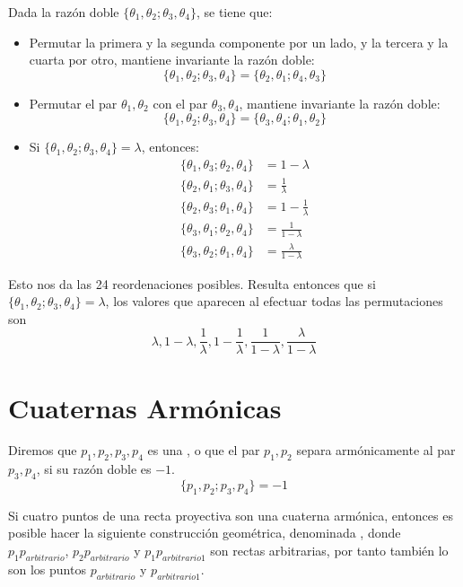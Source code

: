 Dada la razón doble $\{\theta_1,\theta_2;\theta_3,\theta_4\}$, se tiene que:
\begin{itemize}
	\item Permutar la primera y la segunda componente por un lado, y la tercera y la cuarta por otro, mantiene invariante la razón doble: \[\{\theta_1,\theta_2;\theta_3,\theta_4\}=\{\theta_2,\theta_1;\theta_4,\theta_3\}\]
	
	\item Permutar el par $\theta_1,\theta_2$ con el par $\theta_3,\theta_4$, mantiene invariante la razón doble: \[\{\theta_1,\theta_2;\theta_3,\theta_4\}=\{\theta_3,\theta_4;\theta_1,\theta_2\}\]
	
	\item Si $\{\theta_1,\theta_2;\theta_3,\theta_4\}=\lambda$, entonces:
	\begin{equation*}
		\begin{split}
			\{\theta_1,\theta_3;\theta_2,\theta_4\}&=1-\lambda\\
			\{\theta_2,\theta_1;\theta_3,\theta_4\}&=\frac{1}{\lambda}\\
			\{\theta_2,\theta_3;\theta_1,\theta_4\}&=1-\frac{1}{\lambda}\\
			\{\theta_3,\theta_1;\theta_2,\theta_4\}&=\frac{1}{1-\lambda}\\
			\{\theta_3,\theta_2;\theta_1,\theta_4\}&=\frac{\lambda}{1-\lambda}
		\end{split}
	\end{equation*}
\end{itemize}
Esto nos da las 24 reordenaciones posibles. Resulta entonces que si $\{\theta_1,\theta_2;\theta_3,\theta_4\}=\lambda$, los valores que aparecen al efectuar todas las permutaciones son 
\[\lambda,1-\lambda,\frac{1}{\lambda},1-\frac{1}{\lambda},\frac{1}{1-\lambda},\frac{\lambda}{1-\lambda}\]
\section{Cuaternas Armónicas}
\begin{defi}
	Diremos que $p_1,p_2,p_3,p_4$ es una , o que el par $p_1,p_2$ separa armónicamente al par $p_3,p_4$, si su razón doble es $-1$.
	\begin{equation}
		\{p_1,p_2;p_3,p_4\}=-1
	\end{equation}
\end{defi}
Si cuatro puntos de una recta proyectiva son una cuaterna armónica, entonces es posible hacer la siguiente construcción geométrica, denominada , donde $p_1p_{arbitrario}$, $p_2p_{arbitrario}$ y $p_1p_{arbitrario1}$ son rectas arbitrarias, por tanto también lo son los puntos $p_{arbitrario}$ y $p_{arbitrario1}$.

